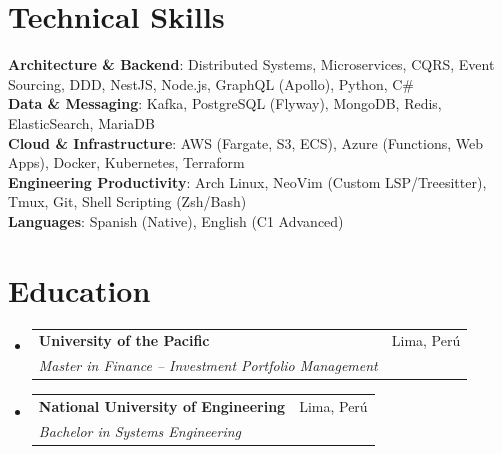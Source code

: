 \documentclass[letterpaper,11pt]{article}
\makeatletter
\newcommand{\resumeSubheading}[4]{
  \vspace{-1pt}\item
    \begin{tabular*}{0.97\textwidth}[t]{l@{\extracolsep{\fill}}r}
      \textbf{#1} & #2 \\
      \textit{\small#3} & \textit{\small #4} \\
    \end{tabular*}\vspace{-5pt}
}
\newcommand{\resumeSubHeadingListStart}{\begin{itemize}[leftmargin=*]}
\newcommand{\resumeSubHeadingListEnd}{\end{itemize}}
\makeatother
\begin{document}
\section{Technical Skills}
 \begin{itemize}[leftmargin=0.15in, labelsep=0.15in]
    \small{\item{
     \textbf{Architecture \& Backend}{: Distributed Systems, Microservices, CQRS, Event Sourcing, DDD, NestJS, Node.js, GraphQL (Apollo), Python, C\#} \\
     \textbf{Data \& Messaging}{: Kafka, PostgreSQL (Flyway), MongoDB, Redis, ElasticSearch, MariaDB} \\
     \textbf{Cloud \& Infrastructure}{: AWS (Fargate, S3, ECS), Azure (Functions, Web Apps), Docker, Kubernetes, Terraform} \\
     \textbf{Engineering Productivity}{: Arch Linux, NeoVim (Custom LSP/Treesitter), Tmux, Git, Shell Scripting (Zsh/Bash)} \\
     \textbf{Languages}{: Spanish (Native), English (C1 Advanced)}
    }}
 \end{itemize}

\section{Education}
\resumeSubHeadingListStart
  \resumeSubheading
    {University of the Pacific}{Lima, Perú}
    {Master in Finance -- Investment Portfolio Management}{}
  \resumeSubheading
    {National University of Engineering}{Lima, Perú}
    {Bachelor in Systems Engineering}{}
\resumeSubHeadingListEnd
\end{document}

